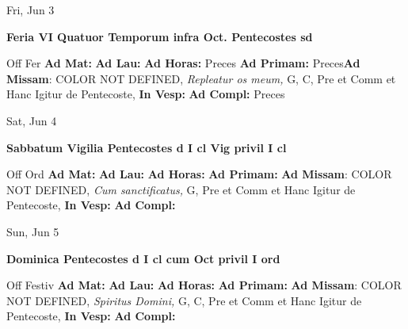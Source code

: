 \documentclass[10pt]{memoir}
\begin{document}
\begin{center}
\begin{minipage}{3.5in}
\vspace{2em}
\begin{center}Fri, Jun 3
\end{center}
\textbf{ \large Feria VI Quatuor Temporum infra Oct. Pentecostes
\textnormal{\normalsize sd}}

\begin{justify}Off Fer
\textbf{Ad Mat: }
\textbf{Ad Lau: }
\textbf{Ad Horas: }Preces
\textbf{Ad Primam: }Preces\textbf{Ad Missam}: COLOR NOT DEFINED, \textit{Repleatur os meum,} G, C, Pre et Comm et Hanc Igitur de Pentecoste, 
\textbf{In Vesp: }
\textbf{Ad Compl: }Preces
\end{justify}
\end{minipage}
\end{center}

\begin{center}
\begin{minipage}{3.5in}
\vspace{2em}
\begin{center}Sat, Jun 4
\end{center}
\textbf{ \large Sabbatum Vigilia Pentecostes
\textnormal{\normalsize d I cl Vig privil I cl}}

\begin{justify}Off Ord
\textbf{Ad Mat: }
\textbf{Ad Lau: }
\textbf{Ad Horas: }
\textbf{Ad Primam: }\textbf{Ad Missam}: COLOR NOT DEFINED, \textit{Cum sanctificatus,} G, Pre et Comm et Hanc Igitur de Pentecoste, 
\textbf{In Vesp: }
\textbf{Ad Compl: }
\end{justify}
\end{minipage}
\end{center}

\begin{center}
\begin{minipage}{3.5in}
\vspace{2em}
\begin{center}Sun, Jun 5
\end{center}
\textbf{ \large Dominica Pentecostes
\textnormal{\normalsize d I cl cum Oct privil I ord}}

\begin{justify}Off Festiv
\textbf{Ad Mat: }
\textbf{Ad Lau: }
\textbf{Ad Horas: }
\textbf{Ad Primam: }\textbf{Ad Missam}: COLOR NOT DEFINED, \textit{Spiritus Domini,} G, C, Pre et Comm et Hanc Igitur de Pentecoste, 
\textbf{In Vesp: }
\textbf{Ad Compl: }
\end{justify}
\end{minipage}
\end{center}
\end{document}
